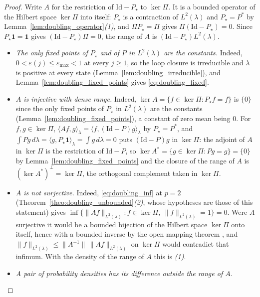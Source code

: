 \begin{proof}
Write $A$ for the restriction of $\mathrm{Id}-P_\star$ to $\ker\Pi$. It is a bounded operator
of the Hilbert space $\ker\Pi$ into itself: $P_\star$ is a contraction of $L^2(\lambda)$ and
$P_\star=P^*$ by Lemma~\ref{lem:doubling_operator}\emph{(1)}, and $\Pi P_\star=\Pi$ gives
$\Pi(\mathrm{Id}-P_\star)=0$. Since $P_\star\mathbf 1=\mathbf 1$ gives
$(\mathrm{Id}-P_\star)\Pi=0$, the range of $A$ is
$\left(\mathrm{Id}-P_\star\right)L^2(\lambda)$.
\begin{itemize}
    \item \emph{The only fixed points of $P_\star$ and of $P$ in $L^2(\lambda)$ are the
    constants.} Indeed, $0<\varepsilon(j)\leq\varepsilon_{\max}<1$ at every $j\geq1$, so the
    loop closure is irreducible and $\lambda$ is positive at every state
    (Lemma~\ref{lem:doubling_irreducible}), and Lemma~\ref{lem:doubling_fixed_points} gives
    \eqref{eq:doubling_fixed}.
    \item \emph{$A$ is injective with dense range.} Indeed, $\ker A=\{f\in\ker\Pi:P_\star f=f\}$
    is $\{0\}$ since the only fixed points of $P_\star$ in $L^2(\lambda)$ are the constants
    (Lemma~\ref{lem:doubling_fixed_points}), a constant of zero mean being $0$. For
    $f,g\in\ker\Pi$,
    $\langle Af,g\rangle_\lambda=\langle f,(\mathrm{Id}-P)g\rangle_\lambda$ by $P_\star=P^*$,
    and $\int Pg\,d\lambda=\langle g,P_\star\mathbf 1\rangle_\lambda=\int g\,d\lambda=0$ puts
    $(\mathrm{Id}-P)g$ in $\ker\Pi$: the adjoint of $A$ in $\ker\Pi$ is the restriction of
    $\mathrm{Id}-P$, so $\ker A^*=\{g\in\ker\Pi:Pg=g\}=\{0\}$ by
    Lemma~\ref{lem:doubling_fixed_points} and the closure of the range of
    $A$ is $(\ker A^*)^\perp=\ker\Pi$, the orthogonal complement taken in $\ker\Pi$.
    \item \emph{$A$ is not surjective.} Indeed, \eqref{eq:doubling_inf} at $p=2$
    (Theorem~\ref{theo:doubling_unbounded}\emph{(2)}, whose hypotheses are those of this
    statement) gives
    $\inf\{\|Af\|_{L^2(\lambda)}:f\in\ker\Pi,\ \|f\|_{L^2(\lambda)}=1\}=0$. Were $A$
    surjective it would be a bounded bijection of the Hilbert space $\ker\Pi$ onto itself, hence
    with a bounded inverse by the open mapping theorem \citep{brezis2011functional}, and
    $\|f\|_{L^2(\lambda)}\leq\|A^{-1}\|\,\|Af\|_{L^2(\lambda)}$ on $\ker\Pi$ would contradict
    that infimum. With the density of the range of $A$ this is \emph{(1)}.
    \item \emph{A pair of probability densities has its difference outside the range of $A$.}

\end{itemize}
\end{proof}
